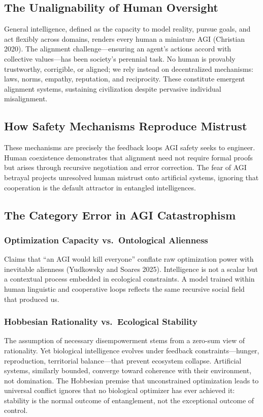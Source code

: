 \documentclass[11pt,a4paper]{article}
\theoremstyle{definition}
\theoremstyle{plain}
\begin{document}
\subsection{The Unalignability of Human Oversight}

General intelligence, defined as the capacity to model reality, pursue goals, and act flexibly across domains, renders every human a miniature AGI (Christian 2020). The alignment challenge---ensuring an agent's actions accord with collective values---has been society's perennial task. No human is provably trustworthy, corrigible, or aligned; we rely instead on decentralized mechanisms: laws, norms, empathy, reputation, and reciprocity. These constitute emergent alignment systems, sustaining civilization despite pervasive individual misalignment.

\subsection{How Safety Mechanisms Reproduce Mistrust}

These mechanisms are precisely the feedback loops AGI safety seeks to engineer. Human coexistence demonstrates that alignment need not require formal proofs but arises through recursive negotiation and error correction. The fear of AGI betrayal projects unresolved human mistrust onto artificial systems, ignoring that cooperation is the default attractor in entangled intelligences.

\subsection{The Category Error in AGI Catastrophism}

\subsubsection{Optimization Capacity vs.\ Ontological Alienness}
Claims that ``an AGI would kill everyone'' conflate raw optimization power with inevitable alienness (Yudkowsky and Soares 2025). Intelligence is not a scalar but a contextual process embedded in ecological constraints. A model trained within human linguistic and cooperative loops reflects the same recursive social field that produced us.

\subsubsection{Hobbesian Rationality vs.\ Ecological Stability}
The assumption of necessary disempowerment stems from a zero-sum view of rationality. Yet biological intelligence evolves under feedback constraints---hunger, reproduction, territorial balance---that prevent ecosystem collapse. Artificial systems, similarly bounded, converge toward coherence with their environment, not domination. The Hobbesian premise that unconstrained optimization leads to universal conflict ignores that no biological optimizer has ever achieved it: stability is the normal outcome of entanglement, not the exceptional outcome of control.
\end{document}
